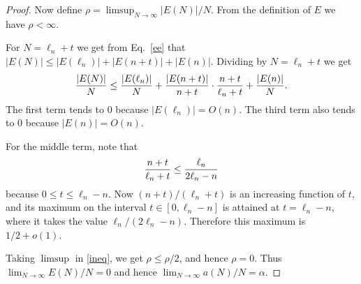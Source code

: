 \documentclass[10pt,a4paper]{amsart}
\begin{document}
\begin{proof}
Now define $\rho = \limsup_{N \rightarrow \infty} |E(N)|/N$.
From  the definition of $E$ we have $\rho < \infty$.

For $N = \ell_n + t$ we get from Eq.~\eqref{ee} that
$|E(N)| \leq |E(\ell_n)| + |E(n+t)| + |E(n)| $.
Dividing by $N = \ell_n + t$ we get
\begin{equation}
{{|E(N)|} \over N} \leq 
{{|E(\ell_n)|} \over N} + 
{{|E(n+t)|} \over {n+t}} \cdot {{n+t} \over {\ell_n + t}} +
{{|E(n)|} \over N}. \label{ineq}
\end{equation}
The first term tends to $0$ because
$|E(\ell_n)| = O(n)$.
The third term also tends to $0$
because $|E(n)| = O(n)$.

For the middle term,  note that 
$$ {{n+t} \over {\ell_n + t}} \leq {{\ell_n} \over {2\ell_n - n}} $$
because $0 \leq t \leq \ell_n - n$.
Now $(n+t)/(\ell_n + t)$ is an increasing function of $t$,
and its maximum on the interval $t \in [0, \ell_n - n]$
is attained at $t = \ell_n -n$, where it takes the value
$\ell_n/(2\ell_n - n)$.
Therefore this maximum is $1/2 + o(1)$.  

Taking $\limsup$ in \eqref{ineq}, we get $\rho \leq \rho/2$,
and hence $\rho = 0$.   Thus
$\lim_{N \rightarrow \infty} E(N)/N = 0$
and hence
$\lim_{N \rightarrow \infty} a(N)/N = \alpha$.
\end{proof}
\end{document}
